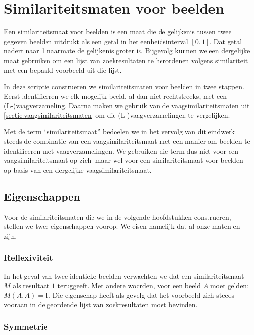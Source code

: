 \chapter{Similariteitsmaten voor beelden}

Een similariteitsmaat voor beelden is een maat die de gelijkenis tussen twee gegeven
beelden uitdrukt als een getal in het eenheidsinterval $[0,1]$. Dat getal nadert naar 1
naarmate de gelijkenis groter is. Bijgevolg kunnen we een dergelijke maat gebruiken om
een lijst van zoekresultaten te herordenen volgens similariteit met een bepaald 
voorbeeld uit die lijst. 

In deze scriptie construeren we similariteitsmaten voor beelden in twee stappen. 
Eerst identificeren we elk mogelijk beeld, al dan niet rechtstreeks, met 
een (L-)vaagverzameling. Daarna maken we gebruik van
de vaagsimilariteitsmaten uit \ref{sectie:vaagsimilariteitsmaten} om die 
(L-)vaagverzamelingen te vergelijken. 

Met de term ``similariteitsmaat'' bedoelen we in het vervolg van dit eindwerk steeds
de combinatie van een vaagsimilariteitsmaat met een manier om beelden te 
identificeren met vaagverzamelingen. We gebruiken die term dus niet voor een 
vaagsimilariteitsmaat op zich, maar wel voor een similariteitsmaat voor beelden
op basis van een dergelijke vaagsimilariteitsmaat.

\section{Eigenschappen}

Voor de similariteitsmaten die we in de volgende hoofdstukken construeren,
stellen we twee eigenschappen voorop. We eisen namelijk dat al onze 
maten  en  zijn.

\subsection{Reflexiviteit}

In het geval van twee identieke beelden verwachten we dat een similariteitsmaat $M$ als resultaat $1$
teruggeeft. Met andere woorden, voor een beeld $A$ moet gelden: $M(A,A)=1$.
Die eigenschap heeft als gevolg dat het voorbeeld zich steeds vooraan in
de geordende lijst van zoekresultaten moet bevinden.

\subsection{Symmetrie}

